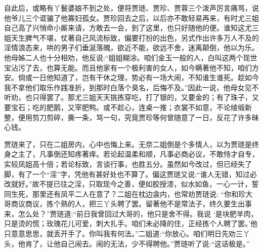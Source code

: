 \begin{parag}
    自此后，或略有丫鬟婆娘不到之处，便将贾琏、贾珍、贾蓉三个泼声厉言痛骂，说他爷儿三个诓骗了他寡妇孤女。贾珍回去之后，以后亦不敢轻易再来，有时尤三姐自己高了兴悄命小厮来请，方敢去一会，到了这里，也只好随他的便。谁知这尤三姐天生脾气不堪，仗著自己风流标致，偏要打扮的出色，另式作出许多万人不及的淫情浪态来，哄的男子们垂涎落魄，欲近不能，欲远不舍，迷离颠倒，他以为乐。他母姊二人也十分相劝，他反说:“姐姐糊涂。咱们金玉一般的人，白叫这两个现世宝沾污了去，也算无能。而且他家有一个极利害的女人，如今瞒著他不知，咱们方安。倘或一日他知道了，岂有干休之理，势必有一场大闹，不知谁生谁死。趁如今我不拿他们取乐作践准折，到那时白落个臭名，后悔不及。”因此一说，他母女见不听劝，也只得罢了。那尤三姐天天挑拣穿吃，打了银的，又要金的；有了珠子，又要宝石；吃的肥鹅，又宰肥鸭。或不趁心，连桌一推；衣裳不如意，不论绫缎新整，便用剪刀剪碎，撕一条，骂一句，究竟贾珍等何曾随意了一日，反花了许多昧心钱。
\end{parag}


\begin{parag}
    贾琏来了，只在二姐房内，心中也悔上来。无奈二姐倒是个多情人，以为贾琏是终身之主了，凡事倒还知疼著痒。若论起温柔和顺，凡事必商必议，不敢恃才自专，实较凤姐高十倍；若论标致，言谈行事，也胜五分。虽然如今改过，但已经失了脚，有了一个“淫”字，凭他有甚好处也不算了。偏这贾琏又说:“谁人无错，知过必改就好。”故不提已往之淫，只取现今之善，便如胶授漆，似水如鱼，一心一计，誓同生死，那里还有凤平二人在意了？二姐在枕边衾内，也常劝贾琏说: “你和珍大哥商议商议，拣个熟的人，把三丫头聘了罢。留著他不是常法子，终久要生出事来，怎么处？”贾琏道:“前日我曾回过大哥的，他只是舍不得。我说 ‘是块肥羊肉，只是烫的慌；玫瑰花儿可爱，刺大扎手。咱们未必降的住，正经拣个人聘了罢。’他只意意思思，就丢开手了。你叫我有何法。”二姐道:“你放心。咱们明日先劝三丫头，他肯了，让他自己闹去。闹的无法，少不得聘他。”贾琏听了说:“这话极是。”
\end{parag}


